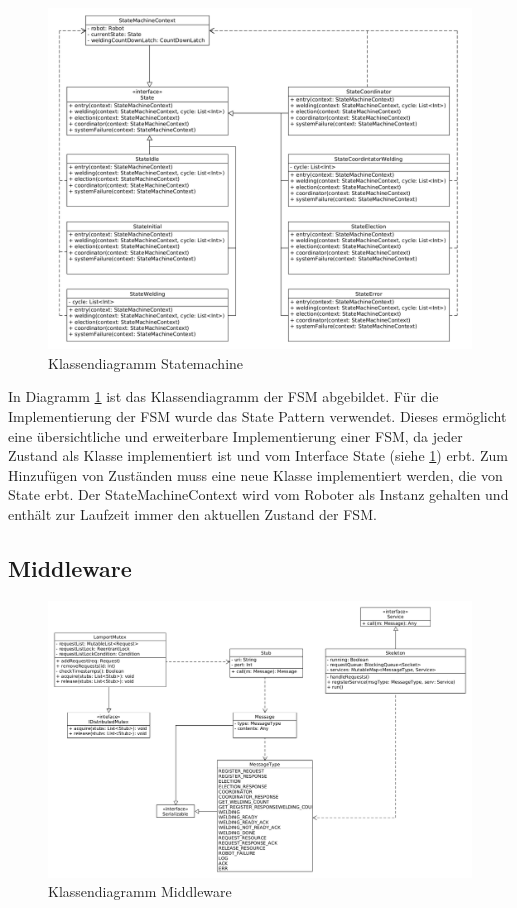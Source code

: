 \begin{figure}[h]
 \includegraphics[width=\textwidth]{../diagrams/5_fsm_klassendiagramm.png}
 \caption{Klassendiagramm Statemachine}
 \label{fig:class_fsm}
\end{figure}

In Diagramm \ref{fig:class_fsm} ist das Klassendiagramm der FSM abgebildet. Für die Implementierung der FSM
wurde das State Pattern \citep{patterns} verwendet. Dieses ermöglicht eine übersichtliche und erweiterbare
Implementierung einer FSM, da jeder Zustand als Klasse implementiert ist und vom Interface \glqq State\grqq{}
(siehe \ref{fig:class_fsm}) erbt. Zum Hinzufügen von Zuständen muss eine neue Klasse implementiert werden, die 
von State erbt. Der StateMachineContext wird vom Roboter als Instanz gehalten und enthält zur Laufzeit immer
den aktuellen Zustand der FSM.

\clearpage

\subsection{Middleware}

\begin{figure}[h]
 \includegraphics[width=\textwidth]{../diagrams/6_middleware_klassendiagramm.png}
 \caption{Klassendiagramm Middleware}
 \label{fig:class_middleware}
\end{figure}

